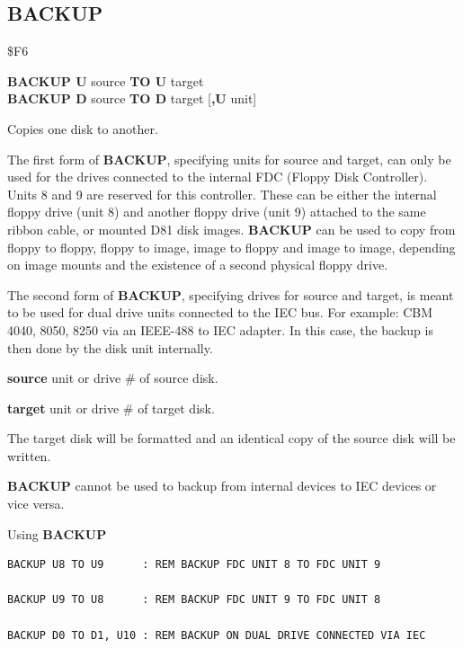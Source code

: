 \subsection{BACKUP}
\begin{description}[leftmargin=2cm,style=nextline]
\item [Token:]    \$F6

\item [Format:]   {\bf BACKUP U} source {\bf TO U} target \\
                  {\bf BACKUP D} source {\bf TO D} target [{\bf,U} unit]

\item [Usage:]    Copies one disk to another.

                  The first form of {\bf BACKUP}, specifying units for source and target, can only be used for the drives connected to the internal FDC (Floppy Disk Controller). Units 8 and 9 are reserved for this controller. These can be either the internal floppy drive (unit 8) and another floppy drive (unit 9) attached to the same ribbon cable, or mounted D81 disk images. {\bf BACKUP} can be used to copy from floppy to floppy, floppy to image, image to floppy and image to image, depending on image mounts and the existence of a second physical floppy drive.

                  The second form of {\bf BACKUP}, specifying drives for source and target, is meant to be used for dual drive units connected to the IEC bus. For example: CBM 4040, 8050, 8250 via an IEEE-488 to IEC adapter. In this case, the backup is then done by the disk unit internally.

                  {\bf source} unit or drive \# of source disk.

                  {\bf target} unit or drive \# of target disk.

\item [Remarks:]  The target disk will be formatted and an identical copy of the source disk will be written.

                  {\bf BACKUP} cannot be used to backup from internal devices to IEC devices or vice versa.

\item [Examples:] Using {\bf BACKUP}

\begin{tcolorbox}[colback=black,coltext=white]
\verbatimfont{\codefont}
\begin{verbatim}
BACKUP U8 TO U9      : REM BACKUP FDC UNIT 8 TO FDC UNIT 9

BACKUP U9 TO U8      : REM BACKUP FDC UNIT 9 TO FDC UNIT 8

BACKUP D0 TO D1, U10 : REM BACKUP ON DUAL DRIVE CONNECTED VIA IEC
\end{verbatim}
\end{tcolorbox}
\end{description}

